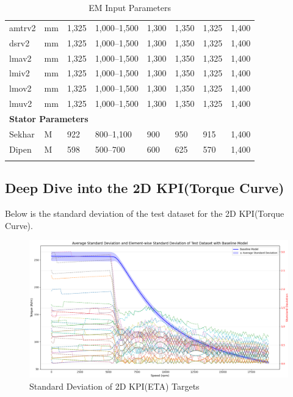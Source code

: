 \documentclass{report} %
\begin{document}
\begin{longtable}{|p{1.5cm}|p{1.5cm}|p{1.5cm}|p{1.5cm}|p{1.5cm}|p{1.5cm}|p{1.5cm}|p{1.5cm}|}
    amtrv2 & mm & 1,325 & 1,000--1,500 & 1,300 & 1,350 & 1,325 & 1,400 \\
    dsrv2 & mm & 1,325 & 1,000--1,500 & 1,300 & 1,350 & 1,325 & 1,400 \\
    lmav2 & mm & 1,325 & 1,000--1,500 & 1,300 & 1,350 & 1,325 & 1,400 \\
    lmiv2 & mm & 1,325 & 1,000--1,500 & 1,300 & 1,350 & 1,325 & 1,400 \\
    lmov2 & mm & 1,325 & 1,000--1,500 & 1,300 & 1,350 & 1,325 & 1,400 \\
    lmuv2 & mm & 1,325 & 1,000--1,500 & 1,300 & 1,350 & 1,325 & 1,400 \\
    \hline
    \multicolumn{8}{|l|}{\textbf{Stator Parameters}} \\
    \hline
    Sekhar & M & 922 & 800--1,100 & 900 & 950 & 915 & 1,400 \\
    Dipen & M & 598 & 500--700 & 600 & 625 & 570 & 1,400 \\
    \hline
    \caption{\ac{EM} Input Parameters}
    \label{tab:Input Parameters} \\
\end{longtable}
    

\subsection{Deep Dive into the \ac{2D} KPI(Torque Curve)}\label{sec:Deep Dive into 2D KPI}
Below is the standard deviation of the test dataset for the 2D KPI(Torque Curve).\\

\begin{figure}[H]
    \centering
    \includegraphics[width=1\textwidth]{./ReportImages/stddev_y1.png} 
    \caption{Standard Deviation of 2D KPI(ETA) Targets} 
    \label{fig:Standard Deviation of 3D KPI(ETA) Targets}
\end{figure}
\end{document}
